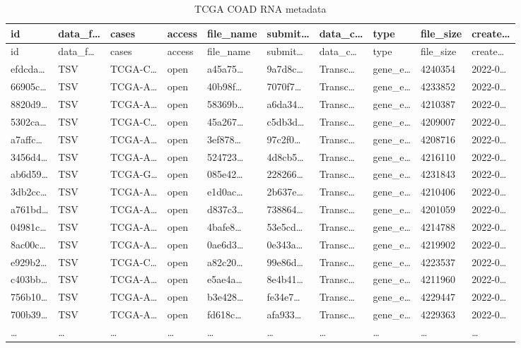 \documentclass[
]{article}
\begin{document}
\begin{longtable}[]{@{}llllllllll@{}}
\caption{\label{tab:TCGA-COAD-RNA-metadata}TCGA COAD RNA metadata}\tabularnewline
\toprule
id & data\_f\ldots{} & cases & access & file\_name & submit\ldots{} & data\_c\ldots{} & type & file\_size & create\ldots{}\tabularnewline
\midrule
\endfirsthead
\toprule
id & data\_f\ldots{} & cases & access & file\_name & submit\ldots{} & data\_c\ldots{} & type & file\_size & create\ldots{}\tabularnewline
\midrule
\endhead
efdcda\ldots{} & TSV & TCGA-C\ldots{} & open & a45a75\ldots{} & 9a7d8c\ldots{} & Transc\ldots{} & gene\_e\ldots{} & 4240354 & 2022-0\ldots{}\tabularnewline
66905c\ldots{} & TSV & TCGA-A\ldots{} & open & 40b98f\ldots{} & 7070f7\ldots{} & Transc\ldots{} & gene\_e\ldots{} & 4233852 & 2022-0\ldots{}\tabularnewline
8820d9\ldots{} & TSV & TCGA-A\ldots{} & open & 58369b\ldots{} & a6da34\ldots{} & Transc\ldots{} & gene\_e\ldots{} & 4210387 & 2022-0\ldots{}\tabularnewline
5302ca\ldots{} & TSV & TCGA-C\ldots{} & open & 45a267\ldots{} & c5db3d\ldots{} & Transc\ldots{} & gene\_e\ldots{} & 4209007 & 2022-0\ldots{}\tabularnewline
a7affc\ldots{} & TSV & TCGA-A\ldots{} & open & 3ef878\ldots{} & 97c2f0\ldots{} & Transc\ldots{} & gene\_e\ldots{} & 4208716 & 2022-0\ldots{}\tabularnewline
3456d4\ldots{} & TSV & TCGA-A\ldots{} & open & 524723\ldots{} & 4d8cb5\ldots{} & Transc\ldots{} & gene\_e\ldots{} & 4216110 & 2022-0\ldots{}\tabularnewline
ab6d59\ldots{} & TSV & TCGA-G\ldots{} & open & 085e42\ldots{} & 228266\ldots{} & Transc\ldots{} & gene\_e\ldots{} & 4231843 & 2022-0\ldots{}\tabularnewline
3db2cc\ldots{} & TSV & TCGA-A\ldots{} & open & e1d0ac\ldots{} & 2b637e\ldots{} & Transc\ldots{} & gene\_e\ldots{} & 4210406 & 2022-0\ldots{}\tabularnewline
a761bd\ldots{} & TSV & TCGA-A\ldots{} & open & d837c3\ldots{} & 738864\ldots{} & Transc\ldots{} & gene\_e\ldots{} & 4201059 & 2022-0\ldots{}\tabularnewline
04981c\ldots{} & TSV & TCGA-A\ldots{} & open & 4bafe8\ldots{} & 53e5cd\ldots{} & Transc\ldots{} & gene\_e\ldots{} & 4214788 & 2022-0\ldots{}\tabularnewline
8ac00c\ldots{} & TSV & TCGA-A\ldots{} & open & 0ae6d3\ldots{} & 0e343a\ldots{} & Transc\ldots{} & gene\_e\ldots{} & 4219902 & 2022-0\ldots{}\tabularnewline
e929b2\ldots{} & TSV & TCGA-C\ldots{} & open & a82c20\ldots{} & 99e86d\ldots{} & Transc\ldots{} & gene\_e\ldots{} & 4223537 & 2022-0\ldots{}\tabularnewline
c403bb\ldots{} & TSV & TCGA-A\ldots{} & open & e5ae4a\ldots{} & 8e4b41\ldots{} & Transc\ldots{} & gene\_e\ldots{} & 4211960 & 2022-0\ldots{}\tabularnewline
756b10\ldots{} & TSV & TCGA-A\ldots{} & open & b3e428\ldots{} & fe34e7\ldots{} & Transc\ldots{} & gene\_e\ldots{} & 4229447 & 2022-0\ldots{}\tabularnewline
700b39\ldots{} & TSV & TCGA-A\ldots{} & open & fd618c\ldots{} & afa933\ldots{} & Transc\ldots{} & gene\_e\ldots{} & 4229363 & 2022-0\ldots{}\tabularnewline
\ldots{} & \ldots{} & \ldots{} & \ldots{} & \ldots{} & \ldots{} & \ldots{} & \ldots{} & \ldots{} & \ldots{}\tabularnewline
\bottomrule
\end{longtable}
\end{document}
